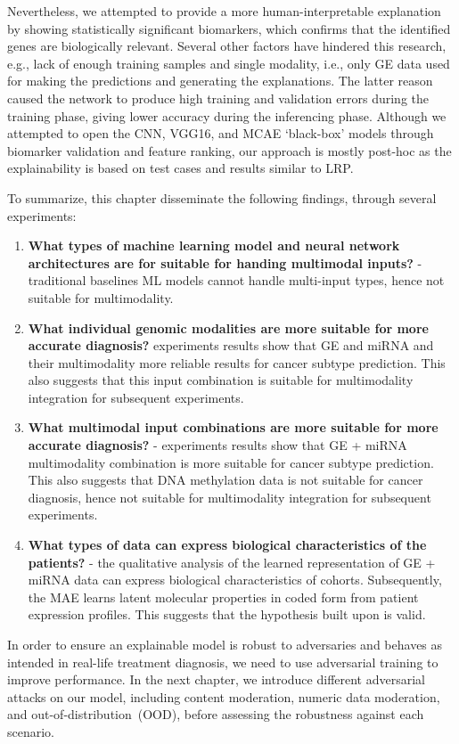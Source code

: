 \hspace*{3.5mm} Nevertheless, we attempted to provide a more human-interpretable explanation by showing statistically significant biomarkers, which confirms that the identified genes are biologically relevant. Several other factors have hindered this research, e.g., lack of enough training samples and single modality, i.e., only GE data used for making the predictions and generating the explanations. The latter reason caused the network to produce high training and validation errors during the training phase, giving lower accuracy during the inferencing phase. Although we attempted to open the CNN, VGG16, and MCAE `black-box' models through biomarker validation and feature ranking, our approach is mostly post-hoc as the explainability is based on test cases and results similar to LRP. 

To summarize, this chapter disseminate the following findings, through several experiments:  

\begin{enumerate}[noitemsep]
    \item \textbf{What types of machine learning model and neural network architectures are for suitable for handing multimodal inputs?} - traditional baselines ML models cannot handle multi-input types, hence not suitable for multimodality. 
    \item \textbf{What individual genomic modalities are more suitable for more accurate diagnosis?} experiments results show that GE and miRNA and their multimodality more reliable results for cancer subtype prediction. This also suggests that this input combination is suitable for multimodality integration for subsequent experiments. 
    \item \textbf{What multimodal input combinations are more suitable for more accurate diagnosis?} - experiments results show that GE + miRNA multimodality combination is more suitable for cancer subtype prediction. This also suggests that DNA methylation data is not suitable for cancer diagnosis, hence not suitable for multimodality integration for subsequent experiments.
    \item \textbf{What types of data can express biological characteristics of the patients?} - the qualitative analysis of the learned representation of GE + miRNA data can express biological characteristics of cohorts. Subsequently, the MAE learns latent molecular properties in coded form from patient expression profiles. This suggests that the hypothesis built upon is valid. 
\end{enumerate}

\hspace*{3.5mm} In order to ensure an explainable model is robust to adversaries and behaves as intended in real-life treatment diagnosis, we need to use adversarial training to improve performance\cite{bhatt2020explainable}. In the next chapter, we introduce different adversarial attacks on our model, including content moderation, numeric data moderation, and out-of-distribution~(OOD), before assessing the robustness against each scenario. 
